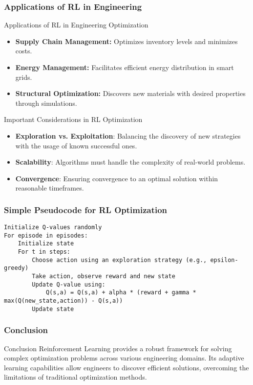 \documentclass[aspectratio=169]{beamer}
\begin{document}
\begin{frame}[fragile]
  \frametitle{Applications of RL in Engineering}
  \begin{block}{Applications of RL in Engineering Optimization}
    \begin{itemize}
      \item \textbf{Supply Chain Management:} Optimizes inventory levels and minimizes costs.
      \item \textbf{Energy Management:} Facilitates efficient energy distribution in smart grids.
      \item \textbf{Structural Optimization:} Discovers new materials with desired properties through simulations.
    \end{itemize}
  \end{block}

  \begin{block}{Important Considerations in RL Optimization}
    \begin{itemize}
      \item \textbf{Exploration vs. Exploitation}: Balancing the discovery of new strategies with the usage of known successful ones.
      \item \textbf{Scalability}: Algorithms must handle the complexity of real-world problems.
      \item \textbf{Convergence}: Ensuring convergence to an optimal solution within reasonable timeframes.
    \end{itemize}
  \end{block}
\end{frame}

\begin{frame}[fragile]
  \frametitle{Simple Pseudocode for RL Optimization}
  \begin{lstlisting}
Initialize Q-values randomly
For episode in episodes:
    Initialize state
    For t in steps:
        Choose action using an exploration strategy (e.g., epsilon-greedy)
        Take action, observe reward and new state
        Update Q-value using:
            Q(s,a) = Q(s,a) + alpha * (reward + gamma * max(Q(new_state,action)) - Q(s,a))
        Update state
  \end{lstlisting}
\end{frame}

\begin{frame}[fragile]
  \frametitle{Conclusion}
  \begin{block}{Conclusion}
    Reinforcement Learning provides a robust framework for solving complex optimization problems across various engineering domains. Its adaptive learning capabilities allow engineers to discover efficient solutions, overcoming the limitations of traditional optimization methods.
  \end{block}
\end{frame}
\end{document}
